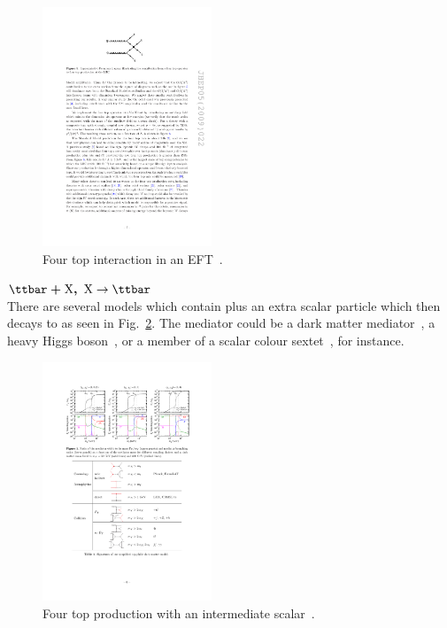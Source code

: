 \begin{figure}[ht!]
\centering
    \includegraphics[width=0.45\textwidth]{images/Theory/EFTTopComp.pdf}
    \caption{Four top interaction in an EFT~\cite{Tait2topcomp}.}
    \label{fig:eft}
\end{figure}

$\boldsymbol{\ttbar+\textrm{X}, ~\textrm{X}}\rightarrow\boldsymbol{\ttbar}$\\
There are several models which contain \ttbar plus an extra scalar particle which then decays to \ttbar as seen in Fig.~\ref{fig:ttXtt}.
The mediator could be a dark matter mediator~\cite{Arina2016}, a heavy Higgs boson~\cite{Bernreuther:2015fts}, or a member of a scalar colour sextet~\cite{Cacciapaglia2015}, for instance. 

\begin{figure}[ht!]
\centering
    \includegraphics[width=0.45\textwidth]{images/Theory/ttDMtt.pdf}
    \caption{Four top production with an intermediate scalar~\cite{Arina2016}.}
    \label{fig:ttXtt}
\end{figure}

